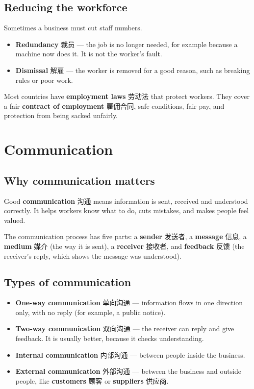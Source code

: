 \documentclass[11pt]{article}
\begin{document}
\subsection*{Reducing the workforce}

Sometimes a business must cut staff numbers.

\begin{itemize}
\item \textbf{Redundancy} 裁员 — the job is no longer needed, for example because a machine now does it. It is not the worker's fault.

\item \textbf{Dismissal} 解雇 — the worker is removed for a good reason, such as breaking rules or poor work.

\end{itemize}

Most countries have \textbf{employment laws} 劳动法 that protect workers. They cover a fair \textbf{contract of employment} 雇佣合同, safe conditions, fair pay, and protection from being sacked unfairly.

\section*{Communication}

\subsection*{Why communication matters}

Good \textbf{communication} 沟通 means information is sent, received and understood correctly. It helps workers know what to do, cuts mistakes, and makes people feel valued.

The communication process has five parts: a \textbf{sender} 发送者, a \textbf{message} 信息, a \textbf{medium} 媒介 (the way it is sent), a \textbf{receiver} 接收者, and \textbf{feedback} 反馈 (the receiver's reply, which shows the message was understood).

\subsection*{Types of communication}

\begin{itemize}
\item \textbf{One-way communication} 单向沟通 — information flows in one direction only, with no reply (for example, a public notice).

\item \textbf{Two-way communication} 双向沟通 — the receiver can reply and give feedback. It is usually better, because it checks understanding.

\item \textbf{Internal communication} 内部沟通 — between people inside the business.

\item \textbf{External communication} 外部沟通 — between the business and outside people, like \textbf{customers} 顾客 or \textbf{suppliers} 供应商.

\end{itemize}
\end{document}
